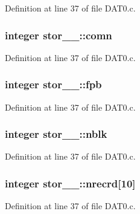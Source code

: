 Definition at line 37 of file D\+A\+T0.\+c.

\subsubsection[{\texorpdfstring{comn}{comn}}]{\setlength{\rightskip}{0pt plus 5cm}integer stor\+\_\+\_\+\+::comn}\hypertarget{structstor__1___ad80d9f5b7a02f35d33c48a0e38c5587b}{}\label{structstor__1___ad80d9f5b7a02f35d33c48a0e38c5587b}


Definition at line 37 of file D\+A\+T0.\+c.

\subsubsection[{\texorpdfstring{fpb}{fpb}}]{\setlength{\rightskip}{0pt plus 5cm}integer stor\+\_\+\_\+\+::fpb}\hypertarget{structstor__1___a6b22b87a6c1f19af004e05cc19861395}{}\label{structstor__1___a6b22b87a6c1f19af004e05cc19861395}


Definition at line 37 of file D\+A\+T0.\+c.

\subsubsection[{\texorpdfstring{nblk}{nblk}}]{\setlength{\rightskip}{0pt plus 5cm}integer stor\+\_\+\_\+\+::nblk}\hypertarget{structstor__1___a44f6d4a08f606df0cb5c82e523e2d507}{}\label{structstor__1___a44f6d4a08f606df0cb5c82e523e2d507}


Definition at line 37 of file D\+A\+T0.\+c.

\subsubsection[{\texorpdfstring{nrecrd}{nrecrd}}]{\setlength{\rightskip}{0pt plus 5cm}integer stor\+\_\+\_\+\+::nrecrd\mbox{[}10\mbox{]}}\hypertarget{structstor__1___ace036822b0cf9e703a8be166f6242d8f}{}\label{structstor__1___ace036822b0cf9e703a8be166f6242d8f}


Definition at line 37 of file D\+A\+T0.\+c.

